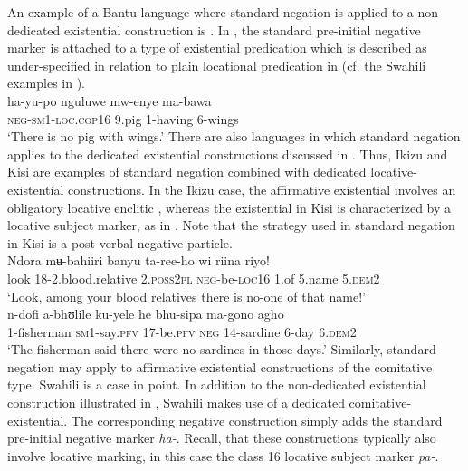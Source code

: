 \documentclass[output=paper]{langsci/langscibook}
\begin{document}
An example of a Bantu language where standard negation is applied to a
non-dedicated existential construction is . In
, the standard pre-initial negative marker is attached
to a type of existential predication which is described as under-specified
in relation to plain locational predication in  (cf. the
Swahili examples in ).
\ea\label{ex:swahili-pig} \\
\gll ha-yu-po nguluwe mw-enye ma-bawa\\ \textsc{neg-sm1-loc.cop16} 9.pig
1-having 6-wings\\ \glt `There is no pig with wings.' \z There are also
languages in which standard negation applies to the dedicated existential
constructions discussed in . Thus, Ikizu and
Kisi are examples of standard negation combined with dedicated
locative-existential constructions. In the Ikizu case, the affirmative
existential involves an obligatory locative enclitic
, whereas the existential in Kisi is characterized
by a locative subject marker, as in . Note that the
strategy used in standard negation in Kisi is a post-verbal negative
particle.  \ea\label{ex:ikizu-relatives} \\ \gll Ndora mʉ-bahiiri banyu ta-ree-ho wi
riina riyo!\\ look 18-2.blood.relative 2.\textsc{poss2pl}
\textsc{neg}-be-\textsc{loc}16 1.of 5.name 5.\textsc{dem}2\\ \glt`Look,
among your blood relatives there is no-one of that name!' \z
\ea\label{ex:kisi-sardines} \\ \gll n-dofi a-bhʊlile ku-yele he bhu-sipa
ma-gono agho\\ 1-fisherman \textsc{sm1}-say.\textsc{pfv} 17-be.\textsc{pfv}
\textsc{neg} 14-sardine 6-day 6.\textsc{dem}2\\ \glt `The fisherman said
there were no sardines in those days.' \z 
%
Similarly, standard negation may apply to affirmative existential
constructions of the comitative type.  Swahili is a case in
point. In addition to the non-dedicated existential construction
illustrated in , Swahili makes use of a dedicated
co\-mi\-ta\-ti\-ve-exis\-ten\-tial. The corresponding negative 
construction simply adds the standard pre-initial negative marker \textit{ha-}. Recall, that these constructions typically also involve locative marking, in this case the class 16 locative subject marker \textit{pa-}.  %
\end{document}
